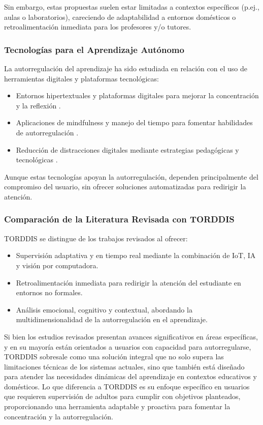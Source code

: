 \documentclass[a4paper,fleqn]{cas-sc}
\begin{document}
				Sin embargo, estas propuestas suelen estar limitadas a contextos específicos (p.ej., aulas o laboratorios), careciendo de adaptabilidad a entornos domésticos o retroalimentación inmediata para los profesores y/o tutores.
				
			\subsubsection{Tecnologías para el Aprendizaje Autónomo}
				La autorregulación del aprendizaje ha sido estudiada en relación con el uso de herramientas digitales y plataformas tecnológicas:
				
				\begin{itemize}
					\item Entornos hipertextuales y plataformas digitales para mejorar la concentración y la reflexión \citep{Peters2003Self, Roberts2020Task}.
					\item Aplicaciones de mindfulness y manejo del tiempo para fomentar habilidades de autorregulación \citep{Adcroft2018Developing}.
					\item Reducción de distracciones digitales mediante estrategias pedagógicas y tecnológicas \citep{Wang2022Empowering}.
				\end{itemize}
				
				Aunque estas tecnologías apoyan la autorregulación, dependen principalmente del compromiso del usuario, sin ofrecer soluciones automatizadas para redirigir la atención.
				
			\subsubsection{Comparación de la Literatura Revisada con TORDDIS}
				TORDDIS se distingue de los trabajos revisados al ofrecer:
				
				\begin{itemize}
					\item Supervisión adaptativa y en tiempo real mediante la combinación de IoT, IA y visión por computadora.
					\item Retroalimentación inmediata para redirigir la atención del estudiante en entornos no formales.
					\item Análisis emocional, cognitivo y contextual, abordando la multidimensionalidad de la autorregulación en el aprendizaje.
				\end{itemize}
				
				Si bien los estudios revisados presentan avances significativos en áreas específicas, y en su mayoría están orientados a usuarios con capacidad para autorregularse, TORDDIS sobresale como una solución integral que no solo supera las limitaciones técnicas de los sistemas actuales, sino que también está diseñado para atender las necesidades dinámicas del aprendizaje en contextos educativos y domésticos. Lo que diferencia a TORDDIS es su enfoque específico en usuarios que requieren supervisión de adultos para cumplir con objetivos planteados, proporcionando una herramienta adaptable y proactiva para fomentar la concentración y la autorregulación.
		
\end{document}
